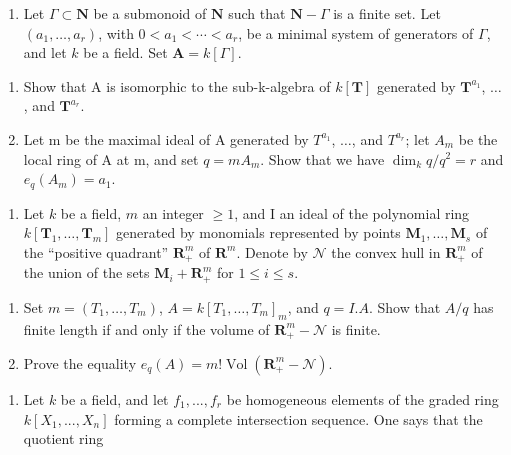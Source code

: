 
\begin{enumerate}
\def\labelenumi{\arabic{enumi})}
\tightlist
\item
  Let \(\Gamma \subset \mathbf{N}\) be a submonoid of \(\mathbf{N}\) such that \(\mathbf{N} - \Gamma\) is a finite set. Let \((a_1, \ldots, a_r)\), with \(0 < a_1 < \cdots < a_r\), be a minimal system of generators of \(\Gamma\), and let \(k\) be a field. Set \(\mathbf{A} = k[\Gamma]\).
\end{enumerate}

\begin{enumerate}
\def\labelenumi{\alph{enumi})}
\item
  Show that A is isomorphic to the sub-k-algebra of \(k[\mathbf{T}]\) generated by \(\mathbf{T}^{a_1}\), \(\ldots\), and \(\mathbf{T}^{a_r}\).
\item
  Let m be the maximal ideal of A generated by \(T^{a_{1}}\), \(\ldots\), and \(T^{a_{r}}\); let \(A_{m}\) be the local ring of A at m, and set \(q = mA_{m}\). Show that we have \(\dim_{k}q/q^{2} = r\) and \(e_{q}(A_{m}) = a_{1}\).
\end{enumerate}

\begin{enumerate}
\def\labelenumi{\arabic{enumi})}
\setcounter{enumi}{1}
\tightlist
\item
  Let \(k\) be a field, \(m\) an integer \(\geqslant 1\), and I an ideal of the polynomial ring \(k[\mathbf{T}_{1},\ldots,\mathbf{T}_{m}]\) generated by monomials represented by points \(\mathbf{M}_{1},\ldots,\mathbf{M}_{s}\) of the “positive quadrant” \(\mathbf{R}_{+}^{m}\) of \(\mathbf{R}^{m}\). Denote by \(\mathcal{N}\) the convex hull in \(\mathbf{R}_{+}^{m}\) of the union of the sets \(\mathbf{M}_{i}+\mathbf{R}_{+}^{m}\) for \(1\leqslant i\leqslant s\).
\end{enumerate}

\begin{enumerate}
\def\labelenumi{\alph{enumi})}
\tightlist
\item
  Set \(m = (T_1, \ldots, T_m)\), \(A = k[T_1, \ldots, T_m]_m\), and \(q = I.A\). Show that \(A/q\) has finite length if and only if the volume of \(\mathbf{R}_+^m - \mathcal{N}\) is finite.
\item
  Prove the equality \(e_q(A) = m! \operatorname{Vol}(\mathbf{R}_+^m - \mathcal{N})\).
\end{enumerate}

\begin{enumerate}
\def\labelenumi{\arabic{enumi})}
\setcounter{enumi}{2}
\tightlist
\item
  Let \(k\) be a field, and let \(f_{1},...,f_{r}\) be homogeneous elements of the graded ring \(k[X_{1},...,X_{n}]\) forming a complete intersection sequence. One says that the quotient ring
\end{enumerate}

